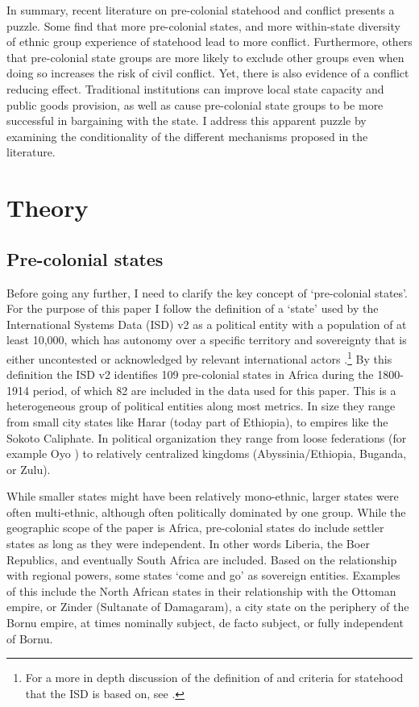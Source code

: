 \documentclass[12pt]{article}
\begin{document}
In summary, recent literature on pre-colonial statehood and conflict presents a
puzzle. Some find that more pre-colonial states, and more within-state diversity
of ethnic group experience of statehood lead to more conflict. Furthermore,
others that pre-colonial state groups are more likely to exclude other groups
even when doing so increases the risk of civil conflict. Yet, there is also
evidence of a conflict reducing effect. Traditional institutions can improve
local state capacity and public goods provision, as well as cause pre-colonial
state groups to be more successful in bargaining with the state. I address this
apparent puzzle by examining the conditionality of the different mechanisms
proposed in the literature.

\section{Theory}
\label{Theory} 

\subsection{Pre-colonial states} \label{Pre-colonial states}

Before going any further, I need to clarify the key concept of `pre-colonial
states'. For the purpose of this paper I follow the definition of a `state' used
by the International Systems Data (ISD) v2 \citep{Butcher2020} as a political
entity with a population of at least 10,000, which has autonomy over a specific
territory and sovereignty that is either uncontested or acknowledged by relevant
international actors \citep{Butcher2020}.\footnote{For a more in depth discussion
of the definition of and criteria for statehood that the ISD is based on, see
\citet{Butcher2017}.} By this definition the ISD v2 identifies 109 pre-colonial
states in Africa during the 1800-1914 period, of which 82 are included in the
data used for this paper. This is a heterogeneous group of political entities
along most metrics. In size they range from small city states like Harar (today
part of Ethiopia), to empires like the Sokoto Caliphate. In political
organization they range from loose federations (for example Oyo \citep{Law1977})
to relatively centralized kingdoms (Abyssinia/Ethiopia, Buganda, or Zulu).

While smaller states might have been relatively mono-ethnic, larger states were
often multi-ethnic, although often politically dominated by one group. While the
geographic scope of the paper is Africa, pre-colonial states do include settler
states as long as they were independent. In other words Liberia, the Boer
Republics, and eventually South Africa are included. Based on the relationship
with regional powers, some states `come and go' as sovereign entities. Examples
of this include the North African states in their relationship with the Ottoman
empire, or Zinder (Sultanate of Damagaram), a city state on the periphery of the
Bornu empire, at times nominally subject, de facto subject, or fully independent
of Bornu.
\end{document}
